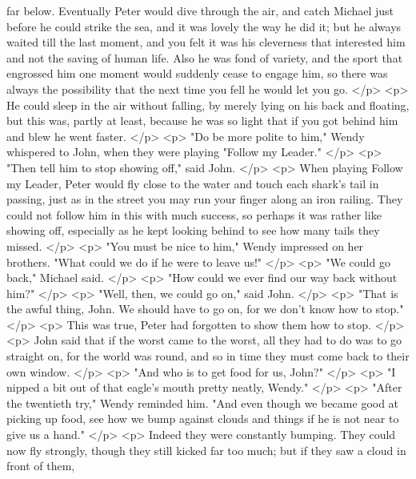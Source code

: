       far below. Eventually Peter would dive through the air, and catch Michael
      just before he could strike the sea, and it was lovely the way he did it;
      but he always waited till the last moment, and you felt it was his
      cleverness that interested him and not the saving of human life. Also he
      was fond of variety, and the sport that engrossed him one moment would
      suddenly cease to engage him, so there was always the possibility that the
      next time you fell he would let you go.
    </p>
    <p>
      He could sleep in the air without falling, by merely lying on his back and
      floating, but this was, partly at least, because he was so light that if
      you got behind him and blew he went faster.
    </p>
    <p>
      "Do be more polite to him," Wendy whispered to John, when they were
      playing "Follow my Leader."
    </p>
    <p>
      "Then tell him to stop showing off," said John.
    </p>
    <p>
      When playing Follow my Leader, Peter would fly close to the water and
      touch each shark's tail in passing, just as in the street you may run your
      finger along an iron railing. They could not follow him in this with much
      success, so perhaps it was rather like showing off, especially as he kept
      looking behind to see how many tails they missed.
    </p>
    <p>
      "You must be nice to him," Wendy impressed on her brothers. "What could we
      do if he were to leave us!"
    </p>
    <p>
      "We could go back," Michael said.
    </p>
    <p>
      "How could we ever find our way back without him?"
    </p>
    <p>
      "Well, then, we could go on," said John.
    </p>
    <p>
      "That is the awful thing, John. We should have to go on, for we don't know
      how to stop."
    </p>
    <p>
      This was true, Peter had forgotten to show them how to stop.
    </p>
    <p>
      John said that if the worst came to the worst, all they had to do was to
      go straight on, for the world was round, and so in time they must come
      back to their own window.
    </p>
    <p>
      "And who is to get food for us, John?"
    </p>
    <p>
      "I nipped a bit out of that eagle's mouth pretty neatly, Wendy."
    </p>
    <p>
      "After the twentieth try," Wendy reminded him. "And even though we became
      good at picking up food, see how we bump against clouds and things if he
      is not near to give us a hand."
    </p>
    <p>
      Indeed they were constantly bumping. They could now fly strongly, though
      they still kicked far too much; but if they saw a cloud in front of them,
